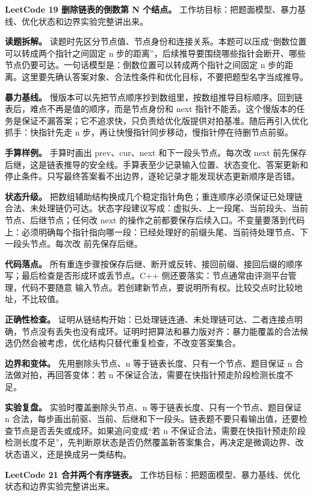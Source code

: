 \noindent\textbf{LeetCode 19 删除链表的倒数第 N 个结点。} 工作坊目标：把题面模型、暴力基线、优化状态和边界实验完整讲出来。

\textbf{读题拆解。} 读题时先区分节点值、节点身份和连接关系。本题可以压成“倒数位置可以转成两个指针之间固定 n 步的距离”，后续推导要围绕哪些指针会断开、哪些节点仍要可达。一句话模型是：倒数位置可以转成两个指针之间固定 n 步的距离。这里要先确认答案对象、合法性条件和优化目标，不要把题型名字当成推导。

\textbf{暴力基线。} 慢版本可以先把节点顺序抄到数组里，按数组推导目标顺序。回到链表后，难点不再是值的顺序，而是节点身份和 next 指针不能丢。这个慢版本的任务是保证不漏答案；它不追求快，只负责给优化版提供对拍基准。随后再引入优化抓手：快指针先走 n 步，再让快慢指针同步移动，慢指针停在待删节点前驱。

\textbf{手算样例。} 手算时画出 prev、cur、next 和下一段头节点。每次改 next 前先保存后继，这是链表推导的安全线。手算表至少记录输入位置、状态变化、答案更新和停止条件。只写最终答案看不出边界，逐轮记录才能发现状态更新顺序是否错。

\textbf{状态升级。} 把数组辅助结构换成几个稳定指针角色；重连顺序必须保证已处理链合法、未处理链仍可达。状态字段建议写成：虚拟头、上一段尾、当前段头、当前节点、后继节点；任何改 next 的操作之前都要保存后续入口。不变量要落到代码上：必须明确每个指针指向哪一段：已经处理好的前缀头尾、当前待处理节点、下一段头节点。每次改  前先保存后继。

\textbf{代码落点。} 所有重连步骤按保存后继、断开或反转、接回前缀、接回后缀的顺序写；最后检查是否形成环或丢节点。C++ 侧还要落实：节点通常由评测平台管理，代码不要随意  输入节点。若创建新节点，要说明所有权。比较交点时比较地址，不比较值。

\textbf{正确性检查。} 证明从链结构开始：已处理链连通、未处理链可达、二者连接点明确，节点没有丢失也没有成环。证明时把算法和暴力版对齐：暴力能覆盖的合法候选仍然会被考虑，优化结构只替代重复检查，不改变答案集合。

\textbf{边界和变体。} 先用删除头节点、n 等于链表长度、只有一个节点、题目保证 n 合法做对拍，再回答变体：若 n 不保证合法，需要在快指针预走阶段检测长度不足。

\textbf{实验复盘。} 实验时覆盖删除头节点、n 等于链表长度、只有一个节点、题目保证 n 合法，每步画出前驱、当前、后继和下一段头。链表题不要只看输出值，还要检查节点是否丢失或成环。如果追问变成“若 n 不保证合法，需要在快指针预走阶段检测长度不足”，先判断原状态是否仍然覆盖新答案集合，再决定是微调边界、改状态语义，还是换成另一类结构。

\noindent\textbf{LeetCode 21 合并两个有序链表。} 工作坊目标：把题面模型、暴力基线、优化状态和边界实验完整讲出来。

